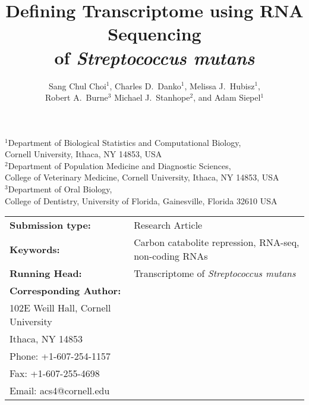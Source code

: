 \documentclass{article}
\begin{document}
\begin{titlepage}

\title{Defining Transcriptome using RNA Sequencing\\
of {\em Streptococcus mutans} }

\author{Sang Chul Choi$^{1}$, Charles D.\ Danko$^{1}$, 
Melissa J.\ Hubisz$^{1}$, \\
Robert A.\ Burne$^{3}$
Michael J.\ Stanhope$^{2}$, and Adam Siepel$^{1}$}

\date{ }
\maketitle

\begin{footnotesize}
\begin{center}
$^1$Department of Biological Statistics and Computational Biology,\\
Cornell University, Ithaca, NY 14853, USA
\\[1ex]
$^2$Department of Population Medicine and Diagnostic Sciences,\\
College of Veterinary Medicine, Cornell University, Ithaca, NY 14853, USA
\\[1ex]
$^3$Department of Oral Biology,\\
College of Dentistry, University of Florida, Gainesville, Florida 32610 USA
\\
\end{center}
\end{footnotesize}

\vspace{1in}

\begin{tabular}{lp{4.5in}}
{\bf Submission type:}& Research Article
\vspace{1ex}\\
{\bf Keywords:}&Carbon catabolite repression, RNA-seq, non-coding RNAs
\vspace{1ex}\\
{\bf Running Head:}&Transcriptome of {\em Streptococcus mutans}
\vspace{1ex}\\ 
{\bf Corresponding Author:}&
\begin{minipage}[t]{4in}
 Adam Siepel\\
 102E Weill Hall, Cornell University\\
 Ithaca, NY 14853\\
 Phone: +1-607-254-1157\\
 Fax: +1-607-255-4698\\
 Email: acs4@cornell.edu
\end{minipage}
\end{tabular}

\thispagestyle{empty}
\end{titlepage}
\end{document}

